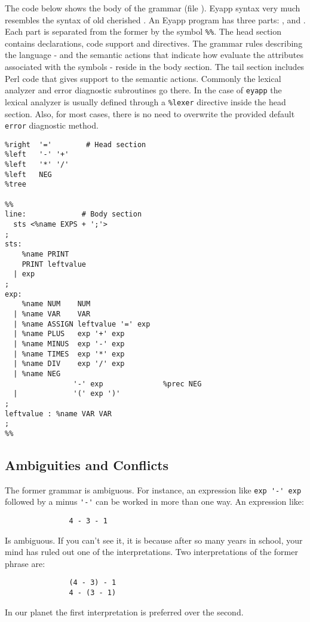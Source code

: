 The code below shows the body of the grammar (file 
).
Eyapp syntax very much resembles the syntax of
old cherished  \cite{yacc}.
An Eyapp program has three parts: ,  and .
Each part is separated from the former by the symbol \verb|%%|.
The head section contains declarations, code support
and directives.
The grammar rules describing
the language - and the semantic actions that indicate how
evaluate the attributes associated with the symbols -
reside in the body section.
The tail section includes Perl code that gives support
to the semantic actions. Commonly 
the lexical analyzer and error diagnostic subroutines
go there. In the case of \verb|eyapp| the lexical analyzer 
is usually defined through a \verb|%lexer| directive inside 
the head section.  Also,
for most cases, there is no need to overwrite the provided default
\verb|error| diagnostic method.

\begin{verbatim}
%right  '='        # Head section
%left   '-' '+'
%left   '*' '/'
%left   NEG
%tree 

%%
line:             # Body section
  sts <%name EXPS + ';'>
;
sts:
    %name PRINT
    PRINT leftvalue
  | exp 
;
exp:
    %name NUM    NUM
  | %name VAR    VAR
  | %name ASSIGN leftvalue '=' exp
  | %name PLUS   exp '+' exp
  | %name MINUS  exp '-' exp
  | %name TIMES  exp '*' exp
  | %name DIV    exp '/' exp
  | %name NEG
                '-' exp              %prec NEG
  |             '(' exp ')'
;
leftvalue : %name VAR VAR
;
%% 
\end{verbatim}

\subsection{Ambiguities and Conflicts}
The former grammar is ambiguous.  
For instance, an expression like \verb|exp '-' exp| followed by a
minus \verb|'-'| can be worked in more than one way. An expression like:

\begin{verbatim}
               4 - 3 - 1
\end{verbatim}

Is ambiguous. If you can't see it, it is because after so many years in 
school, your mind has ruled out one of the interpretations. Two interpretations
of the former phrase are:
\begin{verbatim}
               (4 - 3) - 1
               4 - (3 - 1)
\end{verbatim}
In our planet the first interpretation is preferred over the second.

